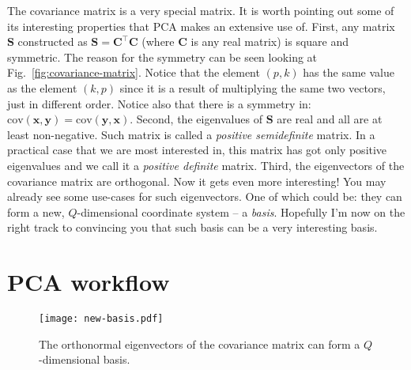 \documentclass[10pt,twocolumn]{article}
\begin{document}
The covariance matrix is a very special matrix. It is worth pointing out some of its interesting properties that PCA makes an extensive use of. First, any matrix $\mathbf{S}$ constructed as $\mathbf{S} = \mathbf{C}^{\top} \mathbf{C}$ (where $\mathbf{C}$ is any real matrix) is square and symmetric. The reason for the symmetry can be seen looking at Fig.~\ref{fig:covariance-matrix}. Notice that the element $(p,k)$ has the same value as the element $(k,p)$ since it is a result of multiplying the same two vectors, just in different order. Notice also that there is a symmetry in: $\text{cov}(\mathbf{x},\mathbf{y}) = \text{cov}(\mathbf{y},\mathbf{x})$. Second, the eigenvalues of $\mathbf{S}$ are real and all are at least non-negative. Such matrix is called a \textit{positive semidefinite} matrix. In a practical case that we are most interested in, this matrix has got only positive eigenvalues and we call it a \textit{positive definite} matrix. Third, the eigenvectors of the covariance matrix are orthogonal. Now it gets even more interesting! You may already see some use-cases for such eigenvectors. One of which could be: they can form a new, $Q$-dimensional coordinate system -- a \textit{basis}. 
Hopefully I'm now on the right track to convincing you that such basis can be a very interesting basis.


\section{PCA workflow}

\begin{figure}[t]
\centering\texttt{[image: new-basis.pdf]}
\caption{The orthonormal eigenvectors of the covariance matrix can form a $Q$-dimensional basis.}
\label{fig:new-basis}
\end{figure}
\end{document}
